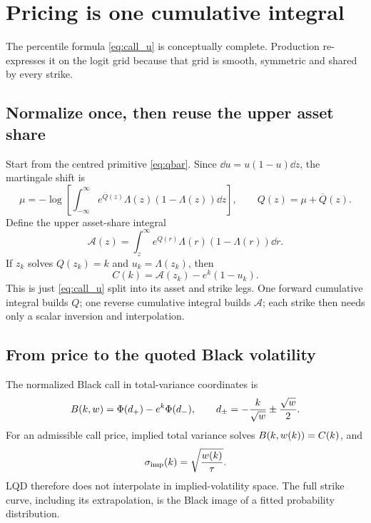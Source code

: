 \documentclass[11pt]{article}
\begin{document}
\section{Pricing is one cumulative integral}
\label{sec:pricing}

The percentile formula \eqref{eq:call_u} is conceptually complete.  Production
re-expresses it on the logit grid because that grid is smooth, symmetric and
shared by every strike.

\subsection{Normalize once, then reuse the upper asset share}

Start from the centred primitive \eqref{eq:qbar}.  Since
$\dd u=u(1-u)\dd z$, the martingale shift is
\begin{equation}
\mu=-\log\!\left[
\int_{-\infty}^{\infty}
e^{\overline Q(z)}\Lambda(z)(1-\Lambda(z))\dd z
\right],
\qquad
Q(z)=\mu+\overline Q(z).
\label{eq:mu}
\end{equation}
Define the upper asset-share integral
\begin{equation}
\mathcal A(z)
=\int_z^\infty e^{Q(r)}\Lambda(r)(1-\Lambda(r))\dd r.
\label{eq:asset_share}
\end{equation}
If $z_k$ solves $Q(z_k)=k$ and $u_k=\Lambda(z_k)$, then
\begin{equation}
C(k)=\mathcal A(z_k)-e^k(1-u_k).
\label{eq:call_z}
\end{equation}
This is just \eqref{eq:call_u} split into its asset and strike legs.  One
forward cumulative integral builds $Q$; one reverse cumulative integral builds
$\mathcal A$; each strike then needs only a scalar inversion and interpolation.

\subsection{From price to the quoted Black volatility}

The normalized Black call in total-variance coordinates is
\begin{equation}
B(k,w)=\Phi(d_+)-e^k\Phi(d_-),
\qquad
d_\pm=-\frac{k}{\sqrt w}\pm\frac{\sqrt w}{2}.
\label{eq:black}
\end{equation}
For an admissible call price, implied total variance solves
$B(k,w(k))=C(k)$, and
\begin{equation}
\sigma_{\rm imp}(k)=\sqrt{\frac{w(k)}{\tau}}.
\end{equation}
LQD therefore does not interpolate in implied-volatility space.  The full
strike curve, including its extrapolation, is the Black image of a fitted
probability distribution.
\end{document}
